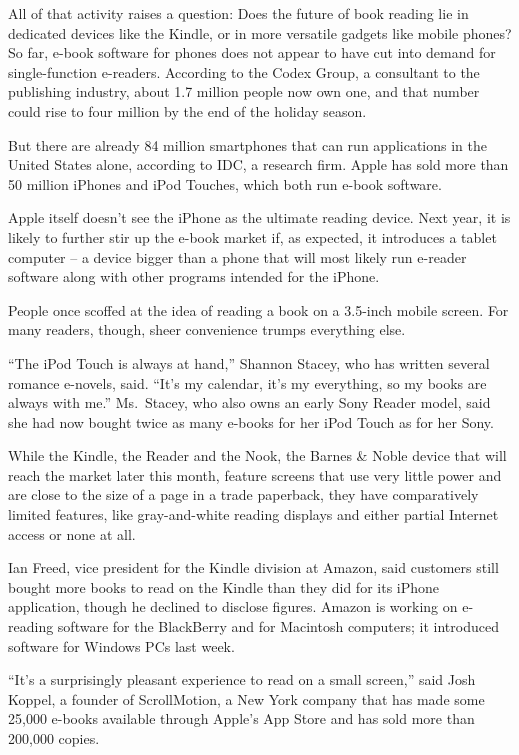 ﻿\documentclass[12pt]{article}
\begin{document}
All of that activity raises a question: Does the future of book reading lie in dedicated devices
like the Kindle, or in more versatile gadgets like mobile phones? So far, e-book software for phones
does not appear to have cut into demand for single-function e-readers. According to the Codex Group,
a consultant to the publishing industry, about 1.7 million people now own one, and that number could
rise to four million by the end of the holiday season.

But there are already 84 million smartphones that can run applications in the United States alone,
according to IDC, a research firm. Apple has sold more than 50 million iPhones and iPod Touches,
which both run e-book software.

Apple itself doesn't see the iPhone as the ultimate reading device. Next year, it is likely to
further stir up the e-book market if, as expected, it introduces a tablet computer -- a device
bigger than a phone that will most likely run e-reader software along with other programs intended
for the iPhone.

People once scoffed\cite{scoff} at the idea of reading a book on a 3.5-inch mobile screen. For many
readers, though, sheer convenience trumps everything else.

``The iPod Touch is always at hand,'' Shannon Stacey, who has written several romance e-novels,
said. ``It's my calendar, it's my everything, so my books are always with me.'' Ms.~Stacey, who also
owns an early Sony Reader model, said she had now bought twice as many e-books for her iPod Touch as
for her Sony.

While the Kindle, the Reader and the Nook, the Barnes \& Noble device that will reach the market
later this month, feature screens that use very little power and are close to the size of a page in
a trade paperback, they have comparatively limited features, like gray-and-white reading displays
and either partial Internet access or none at all.

Ian Freed, vice president for the Kindle division at Amazon, said customers still bought more books
to read on the Kindle than they did for its iPhone application, though he declined to disclose
figures. Amazon is working on e-reading software for the BlackBerry and for Macintosh computers; it
introduced software for Windows PCs last week.

``It's a surprisingly pleasant experience to read on a small screen,'' said Josh Koppel, a founder
of ScrollMotion, a New York company that has made some 25,000 e-books available through Apple's App
Store and has sold more than 200,000 copies.
\end{document}
